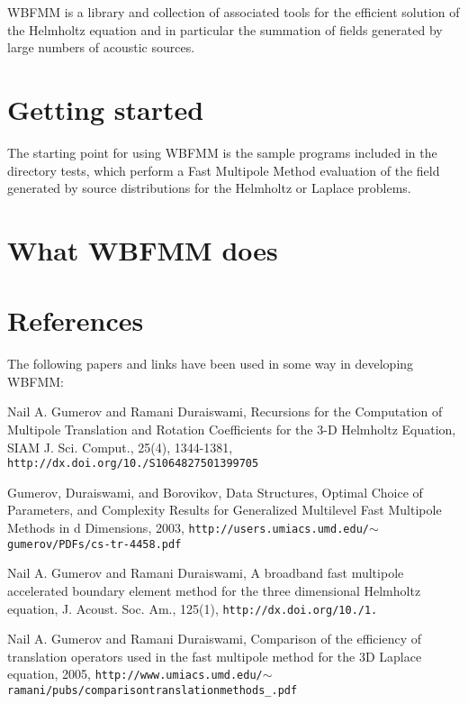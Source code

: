 W\+B\+F\+M\+M is a library and collection of associated tools for the efficient solution of the Helmholtz equation and in particular the summation of fields generated by large numbers of acoustic sources.\section{Getting started}\label{index_start}
The starting point for using W\+B\+F\+M\+M is the sample programs included in the directory tests, which perform a Fast Multipole Method evaluation of the field generated by source distributions for the Helmholtz or Laplace problems.\section{What W\+B\+F\+M\+M does}\label{index_what}
\section{References}\label{index_references}
The following papers and links have been used in some way in developing W\+B\+F\+M\+M\+:


\begin{DoxyEnumerate}
\item Nail A. Gumerov and Ramani Duraiswami, Recursions for the Computation of Multipole Translation and Rotation Coefficients for the 3-\/\+D Helmholtz Equation, S\+I\+A\+M J. Sci. Comput., 25(4), 1344-\/1381, {\tt http\+://dx.\+doi.\+org/10./\+S1064827501399705}
\item Gumerov, Duraiswami, and Borovikov, Data Structures, Optimal Choice of Parameters, and Complexity Results for Generalized Multilevel Fast Multipole Methods in d Dimensions, 2003, {\tt http\+://users.\+umiacs.\+umd.\+edu/$\sim$gumerov/\+P\+D\+Fs/cs-\/tr-\/4458.\+pdf}
\item Nail A. Gumerov and Ramani Duraiswami, A broadband fast multipole accelerated boundary element method for the three dimensional Helmholtz equation, J. Acoust. Soc. Am., 125(1), {\tt http\+://dx.\+doi.\+org/10./1.}
\item Nail A. Gumerov and Ramani Duraiswami, Comparison of the efficiency of translation operators used in the fast multipole method for the 3\+D Laplace equation, 2005, {\tt http\+://www.\+umiacs.\+umd.\+edu/$\sim$ramani/pubs/comparisontranslationmethods\+\_.\+pdf} 
\end{DoxyEnumerate}